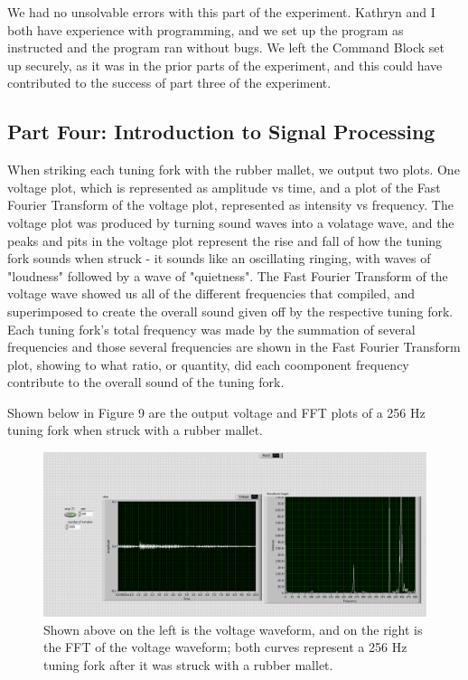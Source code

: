 \documentclass[twoside,10pt]{article}
\begin{document}
\begin{multicols}{2}
		We had no unsolvable errors with this part of the experiment. Kathryn and I both have experience with programming, and we set up the program as instructed and the program ran without bugs. We left the Command Block set up securely, as it was in the prior parts of the experiment, and this could have contributed to the success of part three of the experiment. 
		
		\subsection*{Part Four: Introduction to Signal Processing}

		When striking each tuning fork with the rubber mallet, we output two plots. One voltage plot, which is represented as amplitude vs time, and a plot of the Fast Fourier Transform of the voltage plot, represented as intensity vs frequency. The voltage plot was produced by turning sound waves into a volatage wave, and the peaks and pits in the voltage plot represent the rise and fall of how the tuning fork sounds when struck - it sounds like an oscillating ringing, with waves of "loudness" followed by a wave of "quietness". The Fast Fourier Transform of the voltage wave showed us all of the different frequencies that compiled, and superimposed to create the overall sound given off by the respective tuning fork. Each tuning fork's total frequency was made by the summation of several frequencies and those several frequencies are shown in the Fast Fourier Transform plot, showing to what ratio, or quantity, did each coomponent frequency contribute to the overall sound of the tuning fork.
		
		Shown below in Figure 9 are the output voltage and FFT plots of a 256 Hz tuning fork when struck with a rubber mallet.
		
		\begin{figure}[H]
		\centering
		\includegraphics[width=\linewidth]{group4_256_waveform.png}
		\caption{Shown above on the left is the voltage waveform, and on the right is the FFT of the voltage waveform; both curves represent a 256 Hz tuning fork after it was struck with a rubber mallet.}
		\end{figure}
	

\end{multicols}
\end{document}
